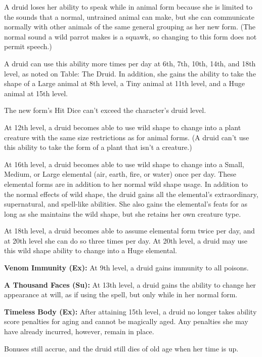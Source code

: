 A druid loses her ability to speak while in animal form because she is limited 
to the sounds that a normal, untrained animal can make, but she can communicate 
normally with other animals of the same general grouping as her new form. (The 
normal sound a wild parrot makes is a squawk, so changing to this form does not 
permit speech.)

A druid can use this ability more times per day at 6th, 7th, 10th, 14th, and 18th 
level, as noted on Table: The Druid. In addition, she gains the ability 
to take the shape of a Large animal at 8th level, a Tiny animal at 11th level, 
and a Huge animal at 15th level.

The new form's Hit Dice can't exceed the character's druid level.

At 12th level, a druid becomes able to use wild shape to change into a plant creature 
with the same size restrictions as for animal forms. (A druid can't use this ability 
to take the form of a plant that isn't a creature.)

At 16th level, a druid becomes able to use wild shape to change into a Small, Medium, 
or Large elemental (air, earth, fire, or water) once per day. These elemental forms 
are in addition to her normal wild shape usage. In addition to the normal effects 
of wild shape, the druid gains all the elemental's extraordinary, supernatural, 
and spell-like abilities. She also gains the elemental's feats for as long as she 
maintains the wild shape, but she retains her own creature type.

At 18th level, a druid becomes able to assume elemental form twice per day, and 
at 20th level she can do so three times per day. At 20th level, a druid may use 
this wild shape ability to change into a Huge elemental.

\textbf{Venom Immunity (Ex):} At 9th level, a druid gains immunity to all poisons. 

\textbf{A Thousand Faces (Su):} At 13th level, a druid gains the ability to change 
her appearance at will, as if using the  spell, but only while 
in her normal form.

\textbf{Timeless Body (Ex):} After attaining 15th level, a druid no longer takes 
ability score penalties for aging and cannot be magically aged. Any penalties she 
may have already incurred, however, remain in place.

Bonuses still accrue, and the druid still dies of old age when her time is up.

